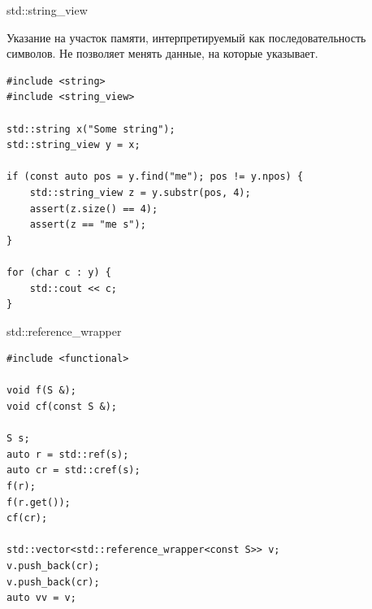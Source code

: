 \documentclass[unknownkeysallowed,xcolor=table]{beamer}
\begin{document}
\begin{frame}[fragile]{std::string\_view}

Указание на участок памяти, интерпретируемый как последовательность символов. Не позволяет менять данные, на которые указывает.

\vspace{1em}

\begin{lstlisting}
#include <string>
#include <string_view>

std::string x("Some string");
std::string_view y = x;

if (const auto pos = y.find("me"); pos != y.npos) {
    std::string_view z = y.substr(pos, 4);
    assert(z.size() == 4);
    assert(z == "me s");
}

for (char c : y) {
    std::cout << c;
}
\end{lstlisting}

\end{frame}

\begin{frame}[fragile]{std::reference\_wrapper}

\begin{lstlisting}
#include <functional>

void f(S &);
void cf(const S &);

S s;
auto r = std::ref(s);
auto cr = std::cref(s);
f(r);
f(r.get());
cf(cr);

std::vector<std::reference_wrapper<const S>> v;
v.push_back(cr);
v.push_back(cr);
auto vv = v;
\end{lstlisting}

\end{frame}
\end{document}
